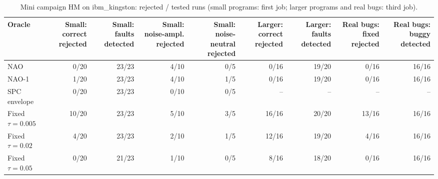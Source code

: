 \begin{table}[t]
\centering
\caption{Mini campaign HM on ibm_kingston: rejected / tested runs (small programs: first job; larger programs and real bugs: third job).}
\label{tab:hm}
\small
\begin{tabular}{lrrrrrrrr}
\toprule
Oracle & Small: correct rejected & Small: faults detected & Small: noise-ampl. rejected & Small: noise-neutral rejected & Larger: correct rejected & Larger: faults detected & Real bugs: fixed rejected & Real bugs: buggy detected \\
\midrule
NAO & 0/20 & 23/23 & 4/10 & 0/5 & 0/16 & 19/20 & 0/16 & 16/16 \\
NAO-1 & 1/20 & 23/23 & 4/10 & 1/5 & 0/16 & 19/20 & 0/16 & 16/16 \\
SPC envelope & 0/20 & 23/23 & 0/10 & 0/5 & -- & -- & -- & -- \\
Fixed $\tau = 0.005$ & 10/20 & 23/23 & 5/10 & 3/5 & 16/16 & 20/20 & 13/16 & 16/16 \\
Fixed $\tau = 0.02$ & 4/20 & 23/23 & 2/10 & 1/5 & 12/16 & 19/20 & 4/16 & 16/16 \\
Fixed $\tau = 0.05$ & 0/20 & 21/23 & 1/10 & 0/5 & 8/16 & 18/20 & 0/16 & 16/16 \\
\bottomrule
\end{tabular}
\end{table}
